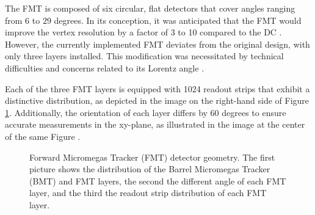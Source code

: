     The FMT is composed of six circular, flat detectors that cover angles ranging from $6$ to $29$ degrees.
    In its conception, it was anticipated that the FMT would improve the vertex resolution by a factor of 3 to 10 compared to the DC \cite{aune2009}.
    However, the currently implemented FMT deviates from the original design, with only three layers installed.
    This modification was necessitated by technical difficulties and concerns related to its Lorentz angle \cite{konczykowski2010}.

    Each of the three FMT layers is equipped with 1024 readout strips that exhibit a distinctive distribution, as depicted in the image on the right-hand side of Figure \ref{fig::12.10::fmt_geometry}.
    Additionally, the orientation of each layer differs by 60 degrees to ensure accurate measurements in the xy-plane, as illustrated in the image at the center of the same Figure \cite{acker2020mvt}.

    \begin{figure}[t]
        \caption[FMT detector geometry]
        {Forward Micromegas Tracker (FMT) detector geometry.
        The first picture shows the distribution of the Barrel Micromegas Tracker (BMT) and FMT layers, the second the different angle of each FMT layer, and the third the readout strip distribution of each FMT layer.}
        \label{fig::12.10::fmt_geometry}
    \end{figure}

    
